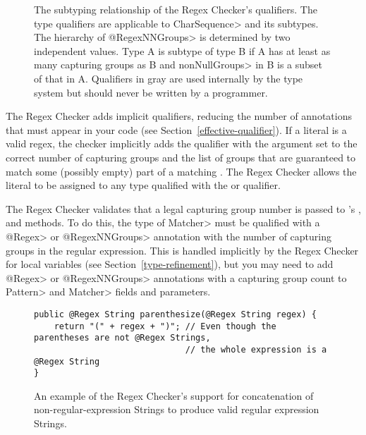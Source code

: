 \begin{figure}
    \caption{The subtyping relationship of the Regex Checker's qualifiers.
    The type qualifiers are applicable to \<CharSequence> and its subtypes.
    The hierarchy of \<@RegexNNGroups> is determined by two independent
    values. Type A is subtype of type B if A has at least as many capturing
    groups as B and \<nonNullGroups> in B is a subset of that
    in A. Qualifiers in gray are used internally by the type system but
    should never be written by a programmer.}
\label{fig-regex-hierarchy-2}
\end{figure}




The Regex Checker adds
implicit qualifiers, reducing the number of annotations that must appear
in your code (see Section~\ref{effective-qualifier}).
If a  literal is a valid regex,
the checker implicitly adds the  qualifier with
the argument set to the correct number of capturing groups and the list
of groups that are guaranteed to match some (possibly empty) part of a
matching .
The Regex Checker allows
the  literal to be assigned to any type qualified with the
 or  qualifier.



The Regex Checker validates that a legal capturing group number is passed
to 's
,
 and
 methods. To do this,
the type of \<Matcher> must be qualified with a \<@Regex> or \<@RegexNNGroups>
annotation with the number of capturing groups in the regular expression. This is
handled implicitly by the Regex Checker for local variables (see
Section~\ref{type-refinement}), but you may need to add \<@Regex> or \<@RegexNNGroups>
annotations with a capturing group count to \<Pattern> and \<Matcher> fields and
parameters.



\begin{figure}
\begin{Verbatim}
public @Regex String parenthesize(@Regex String regex) {
    return "(" + regex + ")"; // Even though the parentheses are not @Regex Strings,
                              // the whole expression is a @Regex String
}
\end{Verbatim}
\caption{An example of the Regex Checker's support for concatenation
of non-regular-expression Strings to produce valid regular expression Strings.}
\label{fig-regex-partial}
\end{figure}

